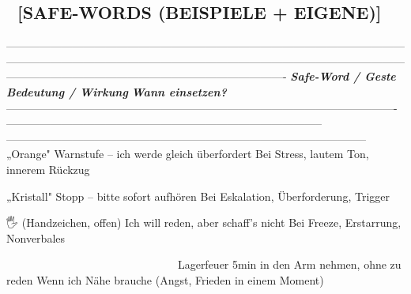 {{\subsection{🔑 \textbf{[SAFE-WORDS (BEISPIELE + EIGENE)]}}

----------------------------------------------------------------------------------------------------------------------------------------------------------------------------------------------------------------------------------------------------------------------------------------------------
\textbf{\textit{Safe-Word / Geste}}                                                                                    \textbf{\textit{Bedeutung / Wirkung}}                                                              \textbf{\textit{Wann einsetzen?}}
---------------------------------------------------------------------------------------------------------- -------------------------------------------------------------------------------------- --------------------------------------------------------------------------------------------------
„Orange"                                                                                                   Warnstufe -- ich werde gleich überfordert                                              Bei Stress, lautem Ton, innerem Rückzug

„Kristall"                                                                                                 Stopp -- bitte sofort aufhören                                                         Bei Eskalation, Überforderung, \textcolor{ctmmRed}{Trigger}

🖐️ (Handzeichen, offen)                                                                                    Ich will reden, aber schaff's nicht                                                    Bei Freeze, Erstarrung, Nonverbales

\textcolor{ctmmBlue}{\faEdit}                                     Lagerfeuer                                                          \textcolor{ctmmBlue}{\faEdit} 5min in den Arm nehmen, ohne zu reden                                               \textcolor{ctmmBlue}{\faEdit} Wenn ich Nähe brauche (Angst, Frieden in einem Moment)

}}
